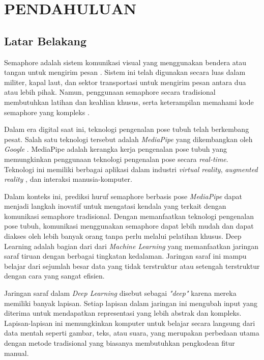 \chapter{PENDAHULUAN}

\section{Latar Belakang}

Semaphore adalah sistem komunikasi visual yang menggunakan bendera atau tangan untuk mengirim pesan \cite{howeth1963history}. Sistem ini telah digunakan secara luas dalam militer, kapal laut, dan sektor transportasi untuk mengirim pesan antara dua atau lebih pihak. Namun, penggunaan semaphore secara tradisional membutuhkan latihan dan keahlian khusus, serta keterampilan memahami kode semaphore yang kompleks \cite{zhao2016convolutional}.

Dalam era digital saat ini, teknologi pengenalan pose tubuh telah berkembang pesat. Salah satu teknologi tersebut adalah \textit{MediaPipe} yang dikembangkan oleh \textit{Google} \cite{huynh2020mediapipe}. MediaPipe adalah kerangka kerja pengenalan pose tubuh yang memungkinkan penggunaan teknologi pengenalan pose secara \textit{real-time}. Teknologi ini memiliki berbagai aplikasi dalam industri \textit{virtual reality}\cite{huynh2020mediapipe}, \textit{augmented reality} \cite{lugaresi2019mediapipe}, dan interaksi manusia-komputer. \cite{harris2021applying}

Dalam konteks ini, prediksi huruf semaphore berbasis pose \textit{MediaPipe} dapat menjadi langkah inovatif untuk mengatasi kendala yang terkait dengan komunikasi semaphore tradisional. Dengan memanfaatkan teknologi pengenalan pose tubuh, komunikasi menggunakan semaphore dapat lebih mudah dan dapat diakses oleh lebih banyak orang tanpa perlu melalui pelatihan khusus. \cite{singh2022realtime}
Deep Learning adalah  bagian dari dari \textit{Machine Learning} yang memanfaatkan jaringan saraf tiruan dengan berbagai tingkatan kedalaman. Jaringan saraf ini mampu belajar dari sejumlah besar data yang tidak terstruktur atau setengah terstruktur dengan cara yang sangat efisien. \cite{deng2014deep}

Jaringan saraf dalam \textit{Deep Learning} disebut sebagai \textit{"deep"} karena mereka memiliki banyak lapisan. Setiap lapisan dalam jaringan ini mengubah input yang diterima untuk mendapatkan representasi yang lebih abstrak dan kompleks. Lapisan-lapisan ini memungkinkan komputer untuk belajar secara langsung dari data mentah seperti gambar, teks, atau suara, yang merupakan perbedaan utama dengan metode tradisional yang biasanya membutuhkan pengkodean fitur manual.

